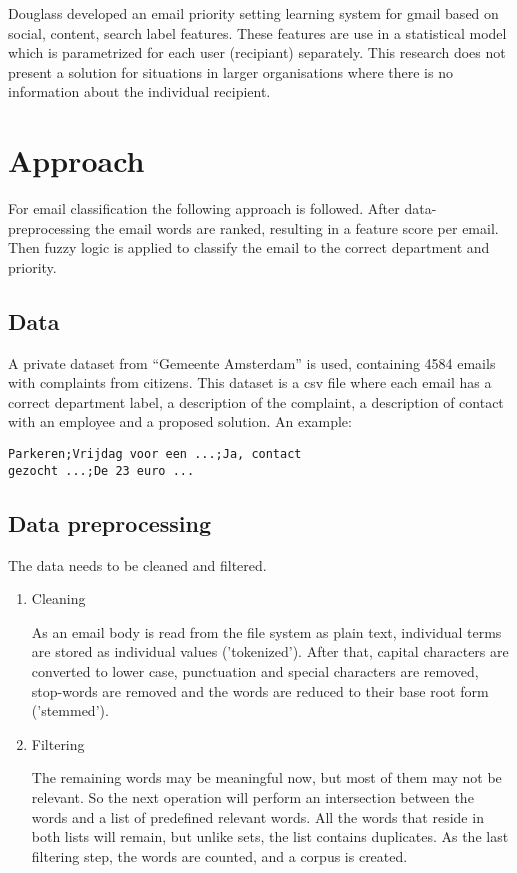 \documentclass[journal]{IEEEtran}
\begin{document}
Douglass \cite{ranking} developed an email priority setting learning system for gmail based on social, content, search label features. These features are use in a statistical model which is parametrized for each user (recipiant) separately. This research does not present a solution for situations in larger organisations where there is no information about the individual recipient. 

\section{Approach}
For email classification the following approach is followed. After data-preprocessing the email words are ranked, resulting in a feature score per email. Then fuzzy logic is applied to classify the email to the correct department and priority. 

\subsection{Data}

A private dataset from ``Gemeente Amsterdam'' is used, containing 4584 emails with complaints from citizens. 
This dataset is a csv file where each email has a correct department label, a description of the complaint, a description of contact with an employee and a proposed solution.
An example:
\begin{lstlisting}
Parkeren;Vrijdag voor een ...;Ja, contact 
gezocht ...;De 23 euro ...
\end{lstlisting}

\subsection{Data preprocessing}
The data needs to be cleaned and filtered.

\begin{enumerate}
    \item Cleaning

    As an email body is read from the file system as plain text, individual terms are stored as individual values ('tokenized'). After that, capital characters are converted to lower case, punctuation and special characters are removed, stop-words are removed and the words are reduced to their base root form ('stemmed'). 

    \item Filtering

    The remaining words may be meaningful now, but most of them may not be 
    relevant. So the next operation will perform an intersection between the 
    words and a list of predefined relevant words. All the words that reside 
    in both lists will remain, but unlike sets, the list contains duplicates.
    As the last filtering step, the words are counted, and a corpus is created.

\end{enumerate}
\end{document}
